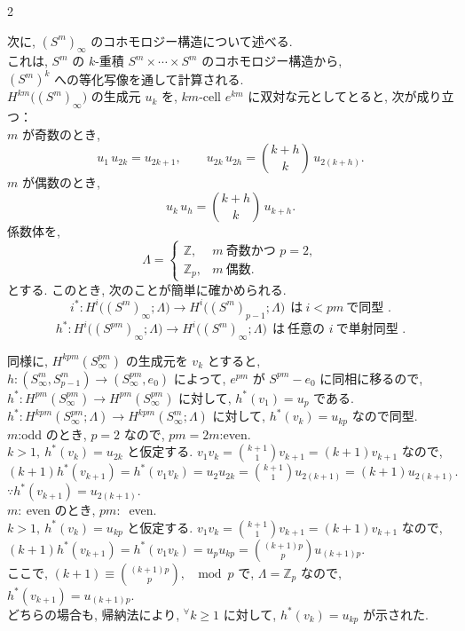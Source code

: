 \documentclass[10pt, leqno]{ltjsarticle} %
\newcommand{\z}{\mathbb{Z}}
\numberwithin{equation}{section}
\theoremstyle{plain}
\theoremstyle{definition}
\theoremstyle{remark}
\begin{document}
\begin{paracol}{2}


次に, $(S^m)_\infty$ のコホモロジー構造について述べる. \\
これは, $S^m$ の $k$-重積 $S^m\times\cdots\times S^m$ のコホモロジー構造から, \\
$(S^m)^k$ への等化写像を通して計算される. \\
$H^{km}\bigl((S^m)_\infty\bigr)$ の生成元 $u_k$ を, 
$km$-cell $e^{km}$ に双対な元としてとると, 次が成り立つ：\\
$m$ が奇数のとき, 
\[
u_1\,u_{2k}=u_{2k+1},\qquad
u_{2k}\,u_{2h}=\binom{k+h}{k}\,u_{2(k+h)}.
\]
$m$ が偶数のとき, 
\[
u_k\,u_h=\binom{k+h}{k}\,u_{k+h}.
\]
係数体を,
\[
\Lambda=
\begin{cases}
\mathbb{Z}, & m\ \text{奇数かつ } p=2,\\
\mathbb{Z}_p, & m\ \text{偶数}.
\end{cases}
\]
とする. このとき, 次のことが簡単に確かめられる. 
\[
i^*:H^i\bigl((S^m)_\infty;\Lambda\bigr)\to H^i\bigl((S^m)_{p-1};\Lambda\bigr)
\ \ \text{は} \ 
i<pm \ \text{で同型 .}
\]
\[
h^*:H^i\bigl((S^{pm})_\infty;\Lambda\bigr)\to H^i\bigl((S^m)_{\infty};\Lambda\bigr)
\ \ \text{は} \ 
\text{任意の } i \ \text{で単射同型 .}
\]

\switchcolumn

\noindent
同様に, 
\(H^{kpm}(S^{pm}_\infty)\)
の生成元を \(v_k\) とすると,\\
\(h:(S^m_\infty, S^m_{p-1})\to(S^{pm}_\infty, e_0)\)
によって, 
\(e^{pm}\) が \(S^{pm}-e_0\) に同相に移るので,\\
\(h^{*}:H^{pm}(S^{pm}_\infty)\to H^{pm}(S^{pm}_\infty)\)
に対して,
\(h^*(v_1) = u_p\)
である.\\

\noindent
\(h^*: H^{kpm}(S^{pm}_\infty; \Lambda)\to H^{kpm}(S^m_\infty; \Lambda)\)
に対して,
\(h^{*}(v_k) = u_{kp}\) 
なので同型.\\
\(m\):odd のとき, \(p=2\) なので, \(pm=2m\):even.\\
\(k>1,\ h^{*}(v_k) = u_{2k}\)
と仮定する. 
\(v_1 v_k = \binom{k+1}{1}v_{k+1} = (k+1)v_{k+1}\)
なので,\\
\((k+1)h^*(v_{k+1}) = h^*(v_1 v_k)
= u_2 u_{2k} = \binom{k+1}{1}u_{2(k+1)}
= (k+1)u_{2(k+1)}.\)\\
\(\because h^*(v_{k+1}) = u_{2(k+1)}.\)\\
\(m:\ \)even のとき, \(pm:\ \) even.\\
\(k>1,\ h^*(v_k) = u_{kp}\) と仮定する.
\(v_1 v_k = \binom{k+1}{1}v_{k+1} = (k+1)v_{k+1}\)
なので,\\
\((k+1)h^*(v_{k+1}) = h^*(v_1 v_k) 
= u_p u_{kp} = \binom{(k+1)p}{p}u_{(k+1)p}\).\\
ここで, 
\((k+1)\equiv\binom{(k+1)p}{p},\ \mod p\)
で, \(\Lambda=\z_p\) なので,
\(h^*(v_{k+1}) = u_{(k+1)p}\).\\
どちらの場合も, 帰納法により,
\({}^\forall k\ge1\) に対して,
\(h^*(v_k) = u_{kp}\)
が示された.

\end{paracol}
\end{document}
